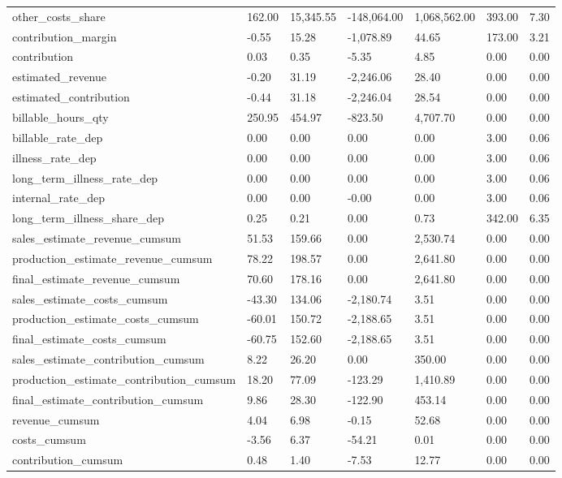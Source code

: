\begin{longtable}[h!]{lllllll}
other_costs_share & 162.00 & 15,345.55 & -148,064.00 & 1,068,562.00 & 393.00 & 7.30 \\
contribution_margin & -0.55 & 15.28 & -1,078.89 & 44.65 & 173.00 & 3.21 \\
contribution & 0.03 & 0.35 & -5.35 & 4.85 & 0.00 & 0.00 \\
estimated_revenue & -0.20 & 31.19 & -2,246.06 & 28.40 & 0.00 & 0.00 \\
estimated_contribution & -0.44 & 31.18 & -2,246.04 & 28.54 & 0.00 & 0.00 \\
billable_hours_qty & 250.95 & 454.97 & -823.50 & 4,707.70 & 0.00 & 0.00 \\
billable_rate_dep & 0.00 & 0.00 & 0.00 & 0.00 & 3.00 & 0.06 \\
illness_rate_dep & 0.00 & 0.00 & 0.00 & 0.00 & 3.00 & 0.06 \\
long_term_illness_rate_dep & 0.00 & 0.00 & 0.00 & 0.00 & 3.00 & 0.06 \\
internal_rate_dep & 0.00 & 0.00 & -0.00 & 0.00 & 3.00 & 0.06 \\
long_term_illness_share_dep & 0.25 & 0.21 & 0.00 & 0.73 & 342.00 & 6.35 \\
sales_estimate_revenue_cumsum & 51.53 & 159.66 & 0.00 & 2,530.74 & 0.00 & 0.00 \\
production_estimate_revenue_cumsum & 78.22 & 198.57 & 0.00 & 2,641.80 & 0.00 & 0.00 \\
final_estimate_revenue_cumsum & 70.60 & 178.16 & 0.00 & 2,641.80 & 0.00 & 0.00 \\
sales_estimate_costs_cumsum & -43.30 & 134.06 & -2,180.74 & 3.51 & 0.00 & 0.00 \\
production_estimate_costs_cumsum & -60.01 & 150.72 & -2,188.65 & 3.51 & 0.00 & 0.00 \\
final_estimate_costs_cumsum & -60.75 & 152.60 & -2,188.65 & 3.51 & 0.00 & 0.00 \\
sales_estimate_contribution_cumsum & 8.22 & 26.20 & 0.00 & 350.00 & 0.00 & 0.00 \\
production_estimate_contribution_cumsum & 18.20 & 77.09 & -123.29 & 1,410.89 & 0.00 & 0.00 \\
final_estimate_contribution_cumsum & 9.86 & 28.30 & -122.90 & 453.14 & 0.00 & 0.00 \\
revenue_cumsum & 4.04 & 6.98 & -0.15 & 52.68 & 0.00 & 0.00 \\
costs_cumsum & -3.56 & 6.37 & -54.21 & 0.01 & 0.00 & 0.00 \\
contribution_cumsum & 0.48 & 1.40 & -7.53 & 12.77 & 0.00 & 0.00 \\

\end{longtable}
